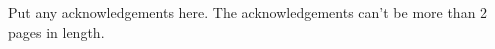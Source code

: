 \documentclass[\main/thesis.tex]{subfiles}
\begin{document}
\begin{acknowledgements} 
Put any acknowledgements here.
The acknowledgements can't be more than 2 pages in length.
\end{acknowledgements}
\end{document}
